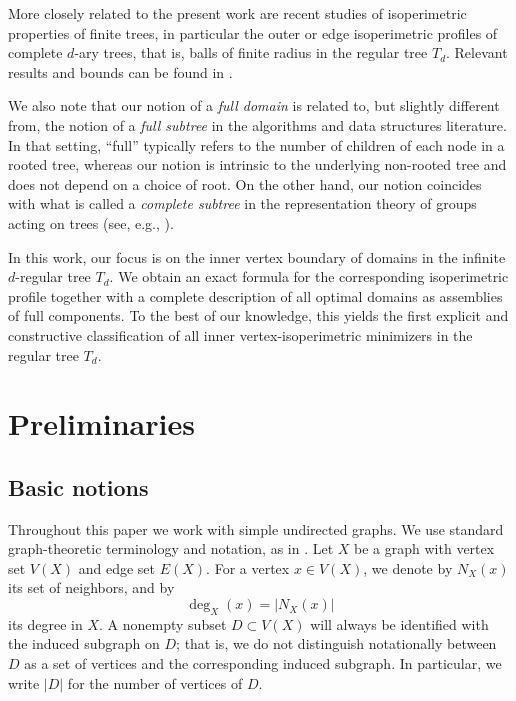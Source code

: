 \documentclass[a4paper, 11pt]{article}
\numberwithin{equation}{section}
\theoremstyle{definition}
\theoremstyle{remark}
\begin{document}
More closely related to the present work are recent studies of isoperimetric properties of finite trees, in particular the outer or edge isoperimetric profiles of complete $d$-ary trees, that is, balls of finite radius in the regular tree $T_d$. Relevant results and bounds can be found in \cite{BharadwajChandran2009, BonatoEtAl2024, Otachi, Vrto2010}.

\smallskip 

We also note that our notion of a \emph{full domain} is related to, but slightly different from, the notion of a \emph{full subtree} in the algorithms and data structures literature. In that setting, “full” typically refers to the number of children of each node in a rooted tree, whereas our notion is intrinsic to the underlying non-rooted tree and does not depend on a choice of root. On the other hand, our notion coincides with what is called a \emph{complete subtree} in the representation theory of groups acting on trees (see, e.g., \cite{Olshanskii1977}).


\smallskip

In this work, our focus is on the inner vertex boundary of domains in the infinite $d$-regular tree $T_d$. We obtain an exact formula for the corresponding isoperimetric profile together with a complete description of all optimal domains as assemblies of full components. To the best of our knowledge, this yields the first explicit and constructive classification of all inner vertex-isoperimetric minimizers in the regular tree $T_d$.



\section{Preliminaries}  \label{sec.prelim}

\subsection{Basic notions}

Throughout this paper we work with simple undirected graphs. We use standard graph-theoretic terminology and notation, as in
\cite{Bollobas,Diestel}. Let $X$ be a graph with vertex set $V(X)$ and edge set $E(X)$.
For a vertex $x\in V(X)$, we denote by $N_X(x)$ its set of neighbors, and by
\[
  \deg_X(x)=|N_X(x)|
\]
its degree in $X$. 
A nonempty subset $D\subset V(X)$ will always be identified with the induced subgraph on $D$; that is, we do not distinguish notationally between $D$ as a set of vertices and the corresponding induced subgraph. In particular, we write $|D|$ for the number of vertices of $D$.
\end{document}
